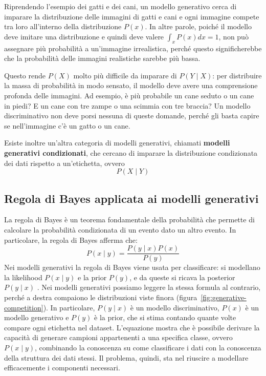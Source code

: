 Riprendendo l'esempio dei gatti e dei cani, un modello generativo cerca di imparare la distribuzione delle immagini di gatti e cani e ogni immagine compete tra loro all'interno della distribuzione $P(x)$. In altre parole, poiché il modello deve imitare una distribuzione e quindi deve valere $\int_x P(x) dx = 1$, non può assegnare più probabilità a un'immagine irrealistica, perché questo significherebbe che la probabilità delle immagini realistiche sarebbe più bassa.

Questo rende $P(X)$ molto più difficile da imparare di $P(Y \mid X)$: per distribuire la massa di probabilità in modo sensato, il modello deve avere una comprensione profonda delle immagini. Ad esempio, è più probabile un cane seduto o un cane in piedi? E un cane con tre zampe o una scimmia con tre braccia? Un modello discriminativo non deve porsi nessuna di queste domande, perché gli basta capire se nell'immagine c'è un gatto o un cane.

Esiste inoltre un'altra categoria di modelli generativi, chiamati \textbf{modelli generativi condizionati}, che cercano di imparare la distribuzione condizionata dei dati rispetto a un'etichetta, ovvero
\[
    P(X \mid Y)
\]

\subsection{Regola di Bayes applicata ai modelli generativi}\label{sec:bayes}
La regola di Bayes è un teorema fondamentale della probabilità che permette di calcolare la probabilità condizionata di un evento dato un altro evento. In particolare, la regola di Bayes afferma che:
\[
    P(x \mid y) = \frac{P(y \mid x) P(x)}{P(y)}
\]
Nei modelli generativi la regola di Bayes viene usata per classificare: si modellano la likelihood $P(x \mid y)$ e la prior $P(y)$, e da queste si ricava la posterior $P(y \mid x)$ \cite{Furnari-FAD}. Nei modelli generativi possiamo leggere la stessa formula al contrario, perché a destra compaiono le distribuzioni viste finora (figura~\ref{fig:generative-competition}). In particolare, $P(y \mid x)$ è un modello discriminativo, $P(x)$ è un modello generativo e $P(y)$ è la prior, che si stima contando quante volte compare ogni etichetta nel dataset. L'equazione mostra che è possibile derivare la capacità di generare campioni appartenenti a una specifica classe, ovvero $P(x \mid y)$, combinando la conoscenza su come classificare i dati con la conoscenza della struttura dei dati stessi. Il problema, quindi, sta nel riuscire a modellare efficacemente i componenti necessari.

